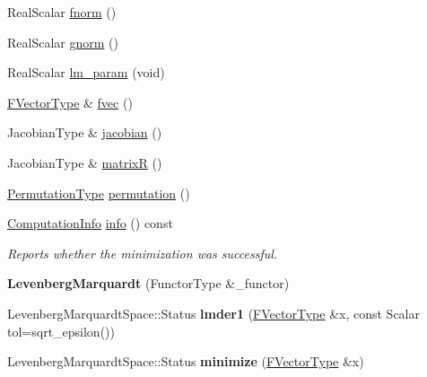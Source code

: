 \begin{DoxyCompactItemize}
\item 
Real\+Scalar \hyperlink{class_eigen_1_1_levenberg_marquardt_ac30c5ce96ac91663b287b2ba7ec7c712}{fnorm} ()
\item 
Real\+Scalar \hyperlink{class_eigen_1_1_levenberg_marquardt_ab91ec0507fb508a2402ac0dfa15af776}{gnorm} ()
\item 
Real\+Scalar \hyperlink{class_eigen_1_1_levenberg_marquardt_aa8aa0d8c1dab58ac51df999587609e09}{lm\+\_\+param} (void)
\item 
\hyperlink{group___core___module}{F\+Vector\+Type} \& \hyperlink{class_eigen_1_1_levenberg_marquardt_a6c296a4a5b91f0ecc398b479a67c242d}{fvec} ()
\item 
Jacobian\+Type \& \hyperlink{class_eigen_1_1_levenberg_marquardt_aaf2179310fdf873483f5d8b46f15da8c}{jacobian} ()
\item 
Jacobian\+Type \& \hyperlink{class_eigen_1_1_levenberg_marquardt_afd6cd64fdd7ca32cc71a83d91432ea69}{matrixR} ()
\item 
\hyperlink{group___core___module}{Permutation\+Type} \hyperlink{class_eigen_1_1_levenberg_marquardt_a691142ba877e072c58016b4be77e9855}{permutation} ()
\item 
\hyperlink{group__enums_ga85fad7b87587764e5cf6b513a9e0ee5e}{Computation\+Info} \hyperlink{class_eigen_1_1_levenberg_marquardt_ae65bdccd2487989ae9b25f9c2e9dfab9}{info} () const
\begin{DoxyCompactList}\small\item\em Reports whether the minimization was successful. \end{DoxyCompactList}\item 
\mbox{\label{class_eigen_1_1_levenberg_marquardt_abb90eff5a097e6558dd5be015691affd}} 
{\bfseries Levenberg\+Marquardt} (Functor\+Type \&\+\_\+functor)
\item 
\mbox{\label{class_eigen_1_1_levenberg_marquardt_abb948f8bbcb5ea8a571c8a3def531501}} 
Levenberg\+Marquardt\+Space\+::\+Status {\bfseries lmder1} (\hyperlink{group___core___module}{F\+Vector\+Type} \&x, const Scalar tol=sqrt\+\_\+epsilon())
\item 
\mbox{\label{class_eigen_1_1_levenberg_marquardt_a5b7c5decf3d9a37c6cfacf795766e928}} 
Levenberg\+Marquardt\+Space\+::\+Status {\bfseries minimize} (\hyperlink{group___core___module}{F\+Vector\+Type} \&x)

\end{DoxyCompactItemize}

